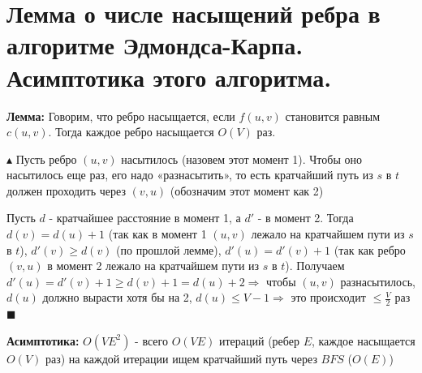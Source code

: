\section{Лемма о числе насыщений ребра в алгоритме Эдмондса-Карпа. Асимптотика этого алгоритма.}
\par \textbf{Лемма:} Говорим, что ребро насыщается, если $f(u,v)$ становится равным $c(u,v)$. Тогда каждое ребро насыщается $O(V)$ раз.
\par $\blacktriangle$ Пусть ребро $(u,v)$ насытилось (назовем этот момент 1). Чтобы оно насытилось еще раз, его надо «разнасытить», то есть кратчайший путь из $s$ в $t$ должен проходить через $(v,u)$ (обозначим этот момент как 2)
\par Пусть $d$ - кратчайшее расстояние в момент 1, а $d'$ - в момент 2. Тогда $d(v)=d(u)+1$ (так как в момент 1 $(u,v)$ лежало на кратчайшем пути из $s$ в $t$), $d'(v) \geq d(v)$ (по прошлой лемме), $d'(u)=d'(v)+1$ (так как ребро $(v,u)$ в момент 2 лежало на кратчайшем пути из $s$ в $t$). Получаем $d'(u)=d'(v)+1 \geq d(v)+1=d(u)+2 \Rightarrow$ чтобы $(u,v)$ разнасытилось, $d(u)$ должно вырасти хотя бы на 2, $d(u) \leq V - 1 \Rightarrow$ это происходит $\leq \frac{V}{2}$ раз $\blacksquare$
\par \textbf{Асимптотика:} $O(VE^2)$ - всего $O(VE)$ итераций (ребер $E$, каждое насыщается $O(V)$ раз) на каждой итерации ищем кратчайший путь через $BFS$ ($O(E)$)
\setcounter{section}{79}
